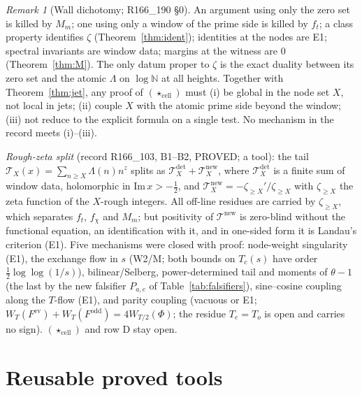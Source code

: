 \documentclass[11pt]{amsart}
\theoremstyle{definition}
\theoremstyle{remark}
\newtheorem{remark}[theorem]{Remark}
\begin{document}
\begin{remark}[Wall dichotomy; R166\_190 \S0]
An argument using only the zero set is killed by $M_m$; one using only a window of the prime side is killed by $f_t$; a class
property identifies $\zeta$ (Theorem~\ref{thm:ident}); identities at the nodes are E1; spectral invariants are window data; margins at
the witness are $0$ (Theorem~\ref{thm:M}). The only datum proper to $\zeta$ is the exact duality between its zero set and the atomic
$\Lambda$ on $\log\mathbb N$ at all heights. Together with Theorem~\ref{thm:jet}, any proof of $(\star_{\mathrm{cell}})$ must (i) be global
in the node set $X$, not local in jets; (ii) couple $X$ with the atomic prime side beyond the window; (iii) not reduce to the explicit
formula on a single test. No mechanism in the record meets (i)--(iii).
\end{remark}

\noindent\emph{Rough-zeta split} (record R166\_103, B1--B2, PROVED; a tool): the tail $\mathcal T_X(x)=\sum_{n\ge X}\Lambda(n)n^{z}$ splits
as $\mathcal T^{\mathrm{det}}_X+\mathcal T^{\mathrm{new}}_X$, where $\mathcal T^{\mathrm{det}}_X$ is a finite sum of window data, holomorphic
in $\mathrm{Im}\,x>-\frac12$, and $\mathcal T^{\mathrm{new}}_X=-\zeta_{\ge X}'/\zeta_{\ge X}$ with $\zeta_{\ge X}$ the zeta function of the
$X$-rough integers. All off-line residues are carried by $\zeta_{\ge X}$, which separates $f_t$, $f_\chi$ and $M_m$; but positivity of
$\mathcal T^{\mathrm{new}}$ is zero-blind without the functional equation, an identification with it, and in one-sided form it is
Landau's criterion (E1). Five mechanisms were closed with proof: node-weight singularity (E1), the exchange flow in $s$ (W2/M; both
bounds on $T_c(s)$ have order $\frac12\log\log(1/s)$), bilinear/Selberg, power-determined tail and moments of $\theta-1$ (the last by the new
falsifier $P_{a,c}$ of Table~\ref{tab:falsifiers}), sine--cosine coupling along the $T$-flow (E1), and parity coupling (vacuous or E1;
$W_T(F^{\mathrm{ev}})+W_T(F^{\mathrm{odd}})=4W_{T/2}(\Phi)$; the residue $T_e=T_o$ is open and carries no sign).
$(\star_{\mathrm{cell}})$ and row D stay open.

\section{Reusable proved tools}\label{sec:tools}
\end{document}
